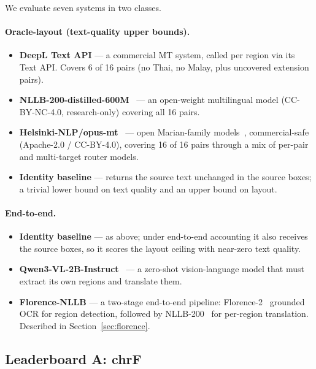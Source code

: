 \documentclass[11pt]{article}
\begin{document}
We evaluate seven systems in two classes.

\paragraph{Oracle-layout (text-quality upper bounds).}
\begin{itemize}
  \item \textbf{DeepL Text API} --- a commercial MT system, called per region
  via its Text API. Covers 6 of 16 pairs (no Thai, no Malay, plus uncovered
  extension pairs).
  \item \textbf{NLLB-200-distilled-600M}~\citep{nllb2022} --- an open-weight
  multilingual model (CC-BY-NC-4.0, research-only) covering all 16 pairs.
  \item \textbf{Helsinki-NLP/opus-mt}~\citep{tiedemann2020opusmt} --- open
  Marian-family models~\citep{junczys2018marian}, commercial-safe
  (Apache-2.0 / CC-BY-4.0), covering 16 of 16 pairs through a mix of per-pair
  and multi-target router models.
  \item \textbf{Identity baseline} --- returns the source text unchanged in the
  source boxes; a trivial lower bound on text quality and an upper bound on
  layout.
\end{itemize}

\paragraph{End-to-end.}
\begin{itemize}
  \item \textbf{Identity baseline} --- as above; under end-to-end accounting it
  also receives the source boxes, so it scores the layout ceiling with
  near-zero text quality.
  \item \textbf{Qwen3-VL-2B-Instruct}~\citep{qwen3vl2025} --- a zero-shot
  vision-language model that must extract its own regions and translate them.
  \item \textbf{Florence-NLLB} --- a two-stage end-to-end pipeline:
  Florence-2~\citep{xiao2024florence2} grounded OCR for region detection,
  followed by NLLB-200~\citep{nllb2022} for per-region translation. Described
  in Section~\ref{sec:florence}.
\end{itemize}

\subsection{Leaderboard A: chrF}
\end{document}
